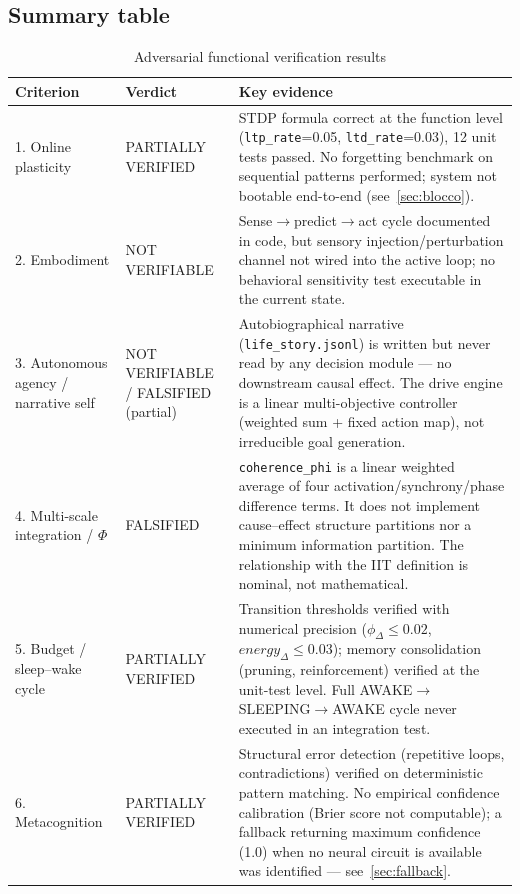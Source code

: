 \documentclass[11pt,a4paper]{article}
\newcommand{\code}[1]{\texttt{#1}}
\newcommand{\coherencephi}{\code{coherence\_phi}}
\begin{document}
\subsection{Summary table}

\begin{table}[h]
\centering
\caption{Adversarial functional verification results}
\label{tab:verdetti}
\begin{tabular}{p{3cm}p{2.5cm}p{8cm}}
\toprule
\textbf{Criterion} & \textbf{Verdict} & \textbf{Key evidence} \\
\midrule
1. Online plasticity & PARTIALLY VERIFIED & STDP formula correct at the function level (\code{ltp\_rate}=0.05, \code{ltd\_rate}=0.03), 12 unit tests passed. No forgetting benchmark on sequential patterns performed; system not bootable end-to-end (see~\ref{sec:blocco}). \\
2. Embodiment & NOT VERIFIABLE & Sense$\to$predict$\to$act cycle documented in code, but sensory injection/perturbation channel not wired into the active loop; no behavioral sensitivity test executable in the current state. \\
3. Autonomous agency / narrative self & NOT VERIFIABLE / FALSIFIED (partial) & Autobiographical narrative (\code{life\_story.jsonl}) is written but never read by any decision module --- no downstream causal effect. The drive engine is a linear multi-objective controller (weighted sum + fixed action map), not irreducible goal generation. \\
4. Multi-scale integration / $\Phi$ & FALSIFIED & \coherencephi{} is a linear weighted average of four activation/synchrony/phase difference terms. It does not implement cause--effect structure partitions nor a minimum information partition. The relationship with the IIT definition is nominal, not mathematical. \\
5. Budget / sleep--wake cycle & PARTIALLY VERIFIED & Transition thresholds verified with numerical precision ($\phi_{\Delta} \leq 0.02$, $energy_{\Delta} \leq 0.03$); memory consolidation (pruning, reinforcement) verified at the unit-test level. Full AWAKE$\to$SLEEPING$\to$AWAKE cycle never executed in an integration test. \\
6. Metacognition & PARTIALLY VERIFIED & Structural error detection (repetitive loops, contradictions) verified on deterministic pattern matching. No empirical confidence calibration (Brier score not computable); a fallback returning maximum confidence (1.0) when no neural circuit is available was identified --- see~\ref{sec:fallback}. \\
\bottomrule
\end{tabular}
\end{table}
\end{document}
